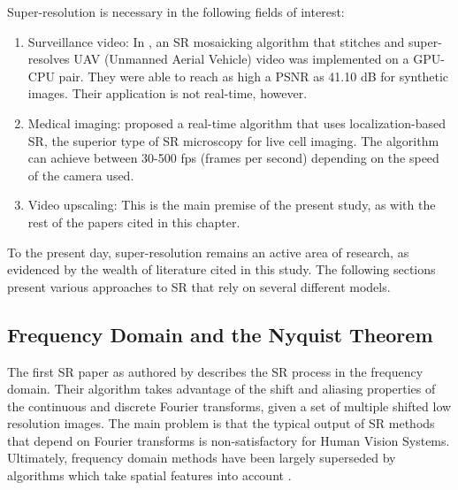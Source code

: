 Super-resolution is necessary in the following fields of interest:
\begin{enumerate}
	\item Surveillance video: In \cite{Camargo2010}, an SR mosaicking algorithm that stitches and super-resolves UAV (Unmanned Aerial Vehicle) video was implemented on a GPU-CPU pair. They were able to reach as high a PSNR as 41.10 dB for synthetic images. Their application is not real-time, however.
	\item Medical imaging: 
	\cite{Quan2010} proposed a real-time algorithm that uses localization-based SR, the superior type of SR microscopy for live cell imaging. The algorithm can achieve between 30-500 fps (frames per second) depending on the speed of the camera used.
	\item Video upscaling: This is the main premise of the present study, as with the rest of the papers cited in this chapter.
\end{enumerate}

To the present day, super-resolution remains an active area of research, as evidenced by the wealth of literature cited in this study. 
The following sections present various approaches to SR that rely on several different models.

%
%


\subsection{Frequency Domain and the Nyquist Theorem}
The first SR paper as authored by \cite{tsai1984multiframe} describes the SR process in the frequency domain. 
Their algorithm takes advantage of the shift and aliasing properties of the continuous and discrete Fourier transforms, given a set of multiple shifted low resolution images. 
The main problem is that the typical output of SR methods that depend on Fourier transforms is non-satisfactory for Human Vision Systems.
Ultimately, frequency domain methods have been largely superseded by algorithms which take spatial features into account \citep{Yang2010a}.


